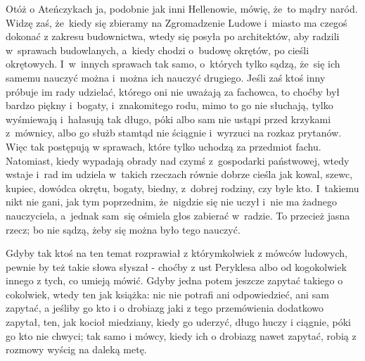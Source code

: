 \documentclass[a4paper,11pt]{article}
\begin{document}

\vspace{\spaceThree}



\noindent
Otóż o Ateńczykach ja, podobnie jak inni Hellenowie, mówię, że~to
mądry naród. Widzę zaś, że~kiedy się zbieramy na Zgromadzenie Ludowe
i~miasto ma czegoś dokonać z zakresu budownictwa, wtedy się posyła po
architektów, aby radzili w~sprawach budowlanych, a~kiedy chodzi
o~budowę okrętów, po cieśli okrętowych. I~w~innych sprawach tak samo,
o~których tylko sądzą, że~się ich samemu nauczyć można i~można ich
nauczyć drugiego. Jeśli zaś ktoś inny próbuje im rady udzielać,
którego oni nie uważają za fachowca, to choćby był bardzo piękny
i~bogaty, i~znakomitego rodu, mimo to go nie słuchają, tylko
wyśmiewają i~hałasują tak długo, póki albo sam nie ustąpi przed
krzykami z~mównicy, albo go służb stamtąd nie ściągnie i~wyrzuci na
rozkaz prytanów. Więc tak postępują w sprawach, które tylko uchodzą za
przedmiot fachu. Natomiast, kiedy wypadają obrady nad czymś
z~gospodarki państwowej, wtedy wstaje i~rad im udziela w~takich
rzeczach równie dobrze cieśla jak kowal, szewc, kupiec, dowódca
okrętu, bogaty, biedny, z~dobrej rodziny, czy byle kto. I~takiemu nikt
nie gani, jak tym poprzednim, że~nigdzie się nie uczył i~nie ma
żadnego nauczyciela, a~jednak sam~się ośmiela głos zabierać
w~radzie. To przecież jasna rzecz; bo nie sądzą, żeby się można było
tego nauczyć.


\vspace{\spaceThree}



\noindent
Gdyby tak ktoś na ten temat rozprawiał z którymkolwiek z mówców
ludowych, pewnie by też takie słowa słyszał - choćby z ust Peryklesa
albo od kogokolwiek innego z tych, co umieją mówić. Gdyby jedna potem
jeszcze zapytać takiego o cokolwiek, wtedy ten jak książka: nic nie
potrafi ani odpowiedzieć, ani sam zapytać, a jeśliby go kto i o
drobiazg jaki z tego przemówienia dodatkowo zapytał, ten, jak kocioł
miedziany, kiedy go uderzyć, długo huczy i ciągnie, póki go kto nie
chwyci; tak samo i mówcy, kiedy ich o drobiazg nawet zapytać, robią z
rozmowy wyścig na daleką metę.


\vspace{\spaceThree}
\end{document}
